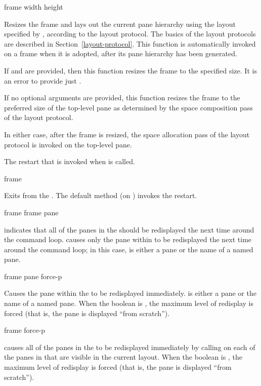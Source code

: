  {frame \optional width height}

Resizes the frame and lays out the current pane hierarchy using the layout
specified by , according to the layout protocol.  The
basics of the layout protocols are described in Section~\ref{layout-protocol}.
This function is automatically invoked on a frame when it is adopted, after its
pane hierarchy has been generated.

If  and  are provided, then this function resizes the
frame to the specified size.  It is an error to provide just .

If no optional arguments are provided, this function resizes the frame to the
preferred size of the top-level pane as determined by the space composition pass
of the layout protocol.

In either case, after the frame is resized, the space allocation pass of the
layout protocol is invoked on the top-level pane.



The restart that is invoked when  is called.

 {frame}

Exits from the  .  The default method (on
) invokes the  restart.


 {frame}
 {frame pane}

 indicates that all of the panes in the 
 should be redisplayed the next time around the command loop.
 causes only the pane  within  to
be redisplayed the next time around the command loop; in this case, 
is either a pane or the name of a named pane.

 {frame pane \key force-p}

Causes the pane  within the   to be redisplayed
immediately.   is either a pane or the name of a named pane.  When the
boolean  is , the maximum level of redisplay is forced
(that is, the pane is displayed ``from scratch'').

 {frame \key force-p}

 causes all of the panes in the 
 to be redisplayed immediately by calling 
on each of the panes in  that are visible in the current layout.
When the boolean  is , the maximum level of redisplay is
forced (that is, the pane is displayed ``from scratch'').

